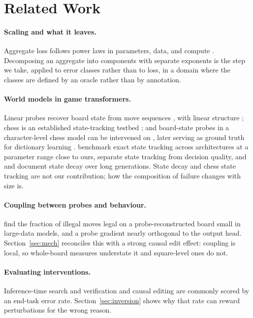 \documentclass[11pt]{article}
\begin{document}
\section{Related Work}

\paragraph{Scaling and what it leaves.}
Aggregate loss follows power laws in parameters, data, and compute
\citep{kaplan2020scaling,hoffmann2022training}. Decomposing an aggregate into
components with separate exponents is the step we take, applied to error classes
rather than to loss, in a domain where the classes are defined by an oracle
rather than by annotation.

\paragraph{World models in game transformers.}
Linear probes recover board state from move sequences \citep{li2023emergent},
with linear structure \citep{nanda2023emergent}; chess is an established
state-tracking testbed \citep{toshniwal2022chess}; and board-state probes in a
character-level chess model can be intervened on \citep{karvonen2024emergent},
later serving as ground truth for dictionary learning \citep{karvonen2024measuring}.
\citet{walker2026chess} benchmark exact state tracking across architectures at a
parameter range close to ours, \citet{li2026tracking} separate state tracking from
decision quality, and \citet{pereira2026transformers} and
\citet{harang2025tracking} document state decay over long generations. State
decay and chess state tracking are not our contribution; how the composition of
failure changes with size is.

\paragraph{Coupling between probes and behaviour.}
\citet{balogh2026verification} find the fraction of illegal moves legal on a
probe-reconstructed board small in large-data models, and a probe gradient
nearly orthogonal to the output head. Section~\ref{sec:mech} reconciles this with
a strong causal edit effect: coupling is local, so whole-board measures
understate it and square-level ones do not.

\paragraph{Evaluating interventions.}
Inference-time search and verification \citep{yao2023tree,lightman2024lets,
wang2023selfconsistency} and causal editing \citep{meng2022locating} are commonly
scored by an end-task error rate. Section~\ref{sec:inversion} shows why that rate
can reward perturbations for the wrong reason.
\end{document}
